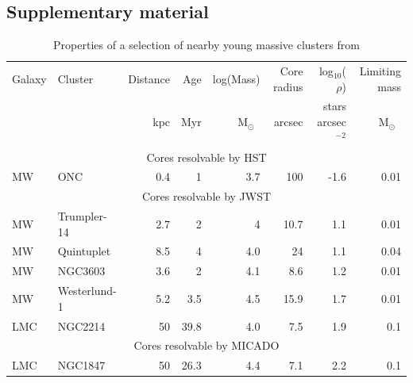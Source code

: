 \documentclass{aa}
\newcommand{\msun}{M$_\odot$~}
\newcommand{\h}[1]{$^{#1}$}
\begin{document}
\begin{appendix}

\section{Supplementary material}
\label{sec:appendix}

\begin{table}
    \centering
    \caption{Properties of a selection of nearby young massive clusters from \citet{portegies2010}}
    \label{tbl:pz10_selection}
    \begin{tabular}{l l r r r r r r}
        \hline\hline
        Galaxy & Cluster      & Distance & Age  & log(Mass) & Core radius & log$_{10}$($\rho$)    & Limiting mass \\
              &              & kpc      & Myr  & \msun     & arcsec  & stars arcsec\h{-2} & \msun         \\
        \hline
        \multicolumn{8}{c}{Cores resolvable by HST}                                                     \\
        \hline
        MW     & ONC          & 0.4      & 1    & 3.7       & 100     & -1.6           & 0.01          \\
        \hline
        \multicolumn{8}{c}{Cores resolvable by JWST}                                                    \\
        \hline
        MW     & Trumpler-14  & 2.7      & 2    & 4         & 10.7    & 1.1            & 0.01          \\
        MW     & Quintuplet   & 8.5      & 4    & 4.0       & 24      & 1.1            & 0.04          \\
        MW     & NGC3603      & 3.6      & 2    & 4.1       & 8.6     & 1.2            & 0.01          \\
        MW     & Westerlund-1 & 5.2      & 3.5  & 4.5       & 15.9    & 1.7            & 0.01          \\
        LMC    & NGC2214      & 50       & 39.8 & 4.0       & 7.5     & 1.9            & 0.1           \\
        \hline
        \multicolumn{8}{c}{Cores resolvable by MICADO}                                                  \\
        \hline
        LMC    & NGC1847      & 50       & 26.3 & 4.4       & 7.1     & 2.2            & 0.1           \\

\end{tabular}
\end{table}
\end{appendix}
\end{document}
